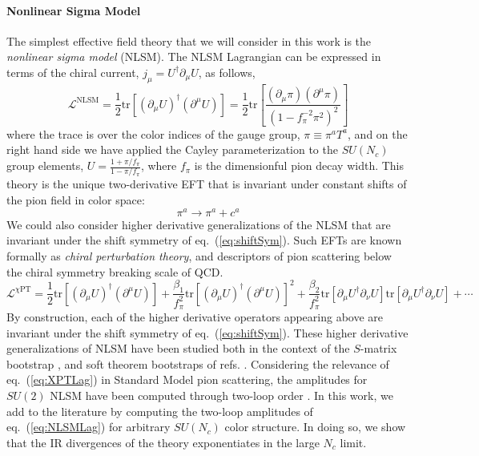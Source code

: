 \documentclass[12pt,letter]{article}
\def\eqn#1{eq.~(\ref{#1})}
\def\be{\begin{equation}}
\def\ee{\end{equation}}
\begin{document}
\paragraph{Nonlinear Sigma Model}
The simplest effective field theory that we will consider in this work is the \textit{nonlinear sigma model} (NLSM). The NLSM Lagrangian can be expressed in terms of the chiral current, $j_\mu = U^\dagger \partial_\mu U$, as follows,
\be\label{eq:NLSMLag}
\mathcal{L}^{\text{NLSM}}= \frac{1}{2}\text{tr}[(\partial_\mu U)^\dagger (\partial ^\mu U)] = \frac{1}{2}\text{tr}\left[\frac{(\partial_\mu\pi )( \partial^\mu \pi) }{(1-f_\pi^{-2}\pi^2)^2}\right]
\ee
where the trace is over the color indices of the gauge group, $\pi \equiv \pi^a T^a$, and on the right hand side we have applied the Cayley parameterization to the $SU(N_c)$ group elements, $U= \frac{1+\pi/f_\pi}{1-\pi/f_\pi}$, where $f_\pi$ is the dimensionful pion decay width. This theory is the unique two-derivative EFT that is invariant under constant shifts of the pion field in color space:
\be\label{eq:shiftSym}
\pi^a \rightarrow \pi^a + c^a
\ee
We could also consider higher derivative generalizations of the NLSM that are invariant under the shift symmetry of \eqn{eq:shiftSym}. Such EFTs are known formally as \textit{chiral perturbation theory}, and descriptors of pion scattering below the chiral symmetry breaking scale of QCD. 
\be\label{eq:XPTLag}
\mathcal{L}^{\chi\text{PT}}=\frac{1}{2}\text{tr}[(\partial_\mu U)^\dagger (\partial ^\mu U)] + \frac{\beta_1}{f_\pi^2} \text{tr}[(\partial_\mu U)^\dagger (\partial ^\mu U)]^2 + \frac{\beta_2}{f_\pi^2} \text{tr}[\partial_\mu U^\dagger \partial_\nu U]\text{tr}[\partial_\mu U^\dagger \partial_\nu U] +\cdots
\ee
By construction, each of the higher derivative operators appearing above are invariant under the shift symmetry of \eqn{eq:shiftSym}. These higher derivative generalizations of NLSM have been studied both in the context of the $S$-matrix bootstrap \cite{}, and soft theorem bootstraps of refs. \cite{}. Considering the relevance of \eqn{eq:XPTLag} in Standard Model pion scattering, the amplitudes for $SU(2)$ NLSM have been computed through two-loop order \cite{} . In this work, we add to the literature by computing the two-loop amplitudes of \eqn{eq:NLSMLag} for arbitrary $SU(N_c)$ color structure. In doing so, we show that the IR divergences of the theory exponentiates in the large $N_c$ limit. 
\end{document}
